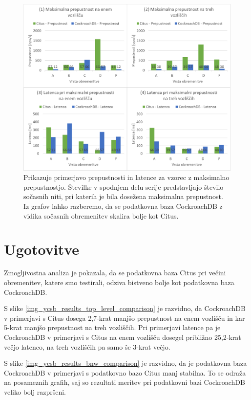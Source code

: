 \documentclass[a4paper, 12pt]{book}
\begin{document}
\begin{figure}[H]
\begin{center}
\includegraphics[width=1.0\textwidth]{resources/maxThroughput.png}
\end{center}
\caption{Prikazuje primerjavo prepustnosti in latence za vzorec z maksimalno prepustnostjo. Številke v spodnjem delu serije predstavljajo število sočasnih niti, pri katerih je bila dosežena maksimalna prepustnost. Iz grafov lahko razberemo, da se podatkovna baza CockroachDB z vidika sočasnih obremenitev skalira bolje kot Citus.}
\label{img_ycsb_results_max_throughput}
\end{figure}

\newpage

\section{Ugotovitve}
Zmogljivostna analiza je pokazala, da se podatkovna baza Citus pri večini obremenitev, katere smo testirali, odziva bistveno bolje kot podatkovna baza CockroachDB.

S slike \ref{img_ycsb_results_top_level_comparison} je razvidno, da CockroachDB v primerjavi s Citus dosega 2,7-krat manjšo prepustnost na enem vozlišču in kar 5-krat manjšo prepustnost na treh vozliščih. Pri primerjavi latence pa je CockroachDB v primerjavi s Citus na enem vozlišču dosegel približno 25,2-krat večjo latenco, na treh vozliščih pa samo še 3-krat večjo.

S slike \ref{img_ycsb_results_bnw_comparison} je razvidno, da je podatkovna baza CockroachDB v primerjavi s podatkovno bazo Citus manj stabilna. To se odraža na posameznih grafih, saj so rezultati meritev pri podatkovni bazi CockroachDB veliko bolj razpršeni.
\end{document}
